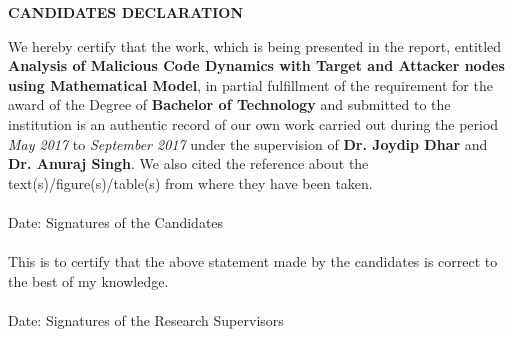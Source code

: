 \newpage
\begin{center}
{\large \bf CANDIDATES DECLARATION}
\end{center}
We hereby certify that the work, which is being presented in the report, entitled {\bf Analysis of Malicious Code Dynamics with
Target and Attacker nodes using Mathematical Model}, in partial fulfillment of the requirement for the award of the
Degree of {\bf Bachelor of Technology} and submitted to the institution is an authentic record of our own work carried out
during the period \emph{May 2017} to \emph{September 2017} under the supervision of {\bf Dr. Joydip Dhar} and {\bf Dr. Anuraj Singh}.
We also cited the reference about the text(s)/figure(s)/table(s) from where they have been taken.\\
\vspace{0.6in} \\
Date: \hspace{3.4in} Signatures of the Candidates \\
\vspace{0.2in} \\
This is to certify that the above statement made by the candidates is correct to the best of my knowledge. \\
\vspace{0.5in}\\
Date: \hspace{2.65in} Signatures of the Research Supervisors \\

